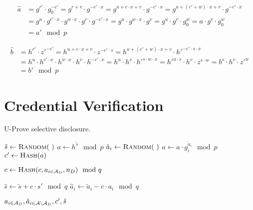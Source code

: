 \begin{align*}
  \hat{a}
  & = g^{r'} \cdot g_0^{-c'}
  = g^{r + v} \cdot g^{-c' \cdot x}
  = g^{u + c \cdot x + v} \cdot g^{-c' \cdot x}
  = g^{u + (c' + w) \cdot x + v} \cdot g^{-c' \cdot x} \\
  & = g^u \cdot g^{c' \cdot x} \cdot g^{w \cdot x} \cdot g^v \cdot g^{-c' \cdot x}
  = g^u \cdot g^{w \cdot x} \cdot g^v
  = g^u \cdot g^v \cdot g_0^w
  = a \cdot g^v \cdot g_0^w \\
  & = a' \mod p
\end{align*}

\begin{align*}
  \hat{b}
  & = h^{r'} \cdot z'^{-c'}
  = h^{u + c \cdot x + v} \cdot z^{-c' \cdot s}
  = h^{u + (c' + w) \cdot x + v} \cdot h'^{-c' \cdot s \cdot x} \\
  & = h^u \cdot h^{c' \cdot x} \cdot h^{w \cdot x} \cdot h^v \cdot h^{-c' \cdot x}
  = h^u \cdot h^v \cdot h'^{s \cdot w \cdot x}
  = h'^{u \cdot s} \cdot h^v \cdot z^{s \cdot w}
  = b^s \cdot h^v \cdot z'^w \\
  & = b' \mod p
\end{align*}

\section{Credential Verification}

\begin{algorithm}
  \caption{U-Prove selective disclosure.}
  \label{alg:UP-selective-disclosure}
  \addtolength{\baselineskip}{1mm}
  \begin{algorithmic}[1]
      \State $\tilde{s} \gets \Call{Random}{~}$
      \State $a \gets h^{\tilde{s}} \mod p$
        \State $\tilde{a}_i \gets \Call{Random}{~}$
        \State $a \gets a \cdot g_i^{\tilde{a}_i} \mod p$
      \EndFor
      \State $c' \gets \Call{Hash}{a}$
      
      \State $c \gets \Call{Hash}{c, a_{i \in \A_D}, n_D} \mod q$
      
      \State $\hat{s} \gets \tilde{s} + c \cdot s' \mod q$
        \State $\hat{a}_i \gets \tilde{a}_i - c \cdot a_i \mod q$
      \EndFor
      
      \Return $a_{i \in \mathcal{A}_D}, \hat{a}_{i \in \mathcal{A} \setminus \mathcal{A}_D}, c', \hat{s}$
    \EndFunction
  \end{algorithmic}
\end{algorithm}

